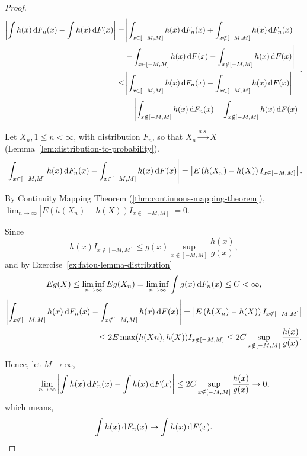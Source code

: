 \begin{proof}
	\begin{equation*}
		\begin{aligned}
			\left|\int h(x)\dif F_{n}(x)-\int h(x)\dif F(x)\right| = & \left|{\int_{x\in[-M,M]}h(x)\dif F_{n}(x)+\int_{x\notin[-M,M]}h(x)\dif F_{n}(x)}\right. \\
			                                                         & \left.{-\int_{x\in[-M,M]}h(x)\dif F(x)-\int_{x\notin[-M,M]}h(x)\dif F(x)}\right|        \\
			\leq                                                     & \left|\int_{x\in[-M,M]}h(x)\dif F_{n}(x)-\int_{x\in[-M,M]}h(x)\dif F(x)\right|          \\
			                                                         & + \left|\int_{x\notin[-M,M]}h(x)\dif F_{n}(x)-\int_{x\notin[-M,M]}h(x)\dif F(x)\right|
		\end{aligned}.
	\end{equation*}

	Let $X_n,1\leq n<\infty$, with distribution $F_n$, so that $X_n\stackrel{a.s.}{\rightarrow}X$ (Lemma~\ref{lem:distribution-to-probability}).
	\begin{equation*}
		\left|\int_{x\in[-M,M]}h(x)\mathop{}\!\mathrm{d} F_{n}(x)-\int_{x\in[-M,M]}h(x)\mathop{}\!\mathrm{d} F(x)\right| = \left|E\left(h(X_n)-h(X)\right)I_{x\in[-M,M]}\right|.
	\end{equation*}

	By Continuity Mapping Theorem (\ref{thm:continuous-mapping-theorem}), $\lim_{n\rightarrow\infty}\left|E\left(h(X_n)-h(X)\right)I_{x\in[-M,M]}\right| = 0$.

	Since
	\begin{equation*}
		h(x)I_{x\notin[-M,M]}\leq g(x)\sup_{x\notin[-M,M]}\frac{h(x)}{g(x)},
	\end{equation*}
	and by Exercise~\ref{ex:fatou-lemma-distribution}
	\begin{equation*}
		Eg(X) \leq \liminf_{n\rightarrow\infty}Eg(X_n)=\liminf_{n\rightarrow\infty}\int g(x)\mathop{}\!\mathrm{d} F_{n}(x)\leq C<\infty,
	\end{equation*}
	\begin{equation*}
		\begin{aligned}
			\left|\int_{x\notin[-M,M]}h(x)\mathop{}\!\mathrm{d} F_{n}(x)-\int_{x\notin[-M,M]}h(x)\mathop{}\!\mathrm{d} F(x)\right| = \left|E\left(h(X_n)-h(X)\right)I_{x\notin[-M,M]}\right| \\
			\leq 2E\max(h(Xn),h(X))I_{x\notin[-M,M]}\leq 2C\sup_{x\notin[-M,M]}\frac{h(x)}{g(x)}.                                                          \\
		\end{aligned}
	\end{equation*}

	Hence, let $M\rightarrow\infty$,
	\begin{equation*}
		\lim_{n\rightarrow\infty}\left|\int h(x)\mathop{}\!\mathrm{d} F_{n}(x)-\int h(x)\mathop{}\!\mathrm{d} F(x)\right| \leq 2C\sup_{x\notin[-M,M]}\frac{h(x)}{g(x)}\rightarrow 0,
	\end{equation*}
	which means,
	\begin{equation*}
		\int h(x)\mathop{}\!\mathrm{d} F_{n}(x) \rightarrow \int h(x)\mathop{}\!\mathrm{d} F(x).
	\end{equation*}
\end{proof}

